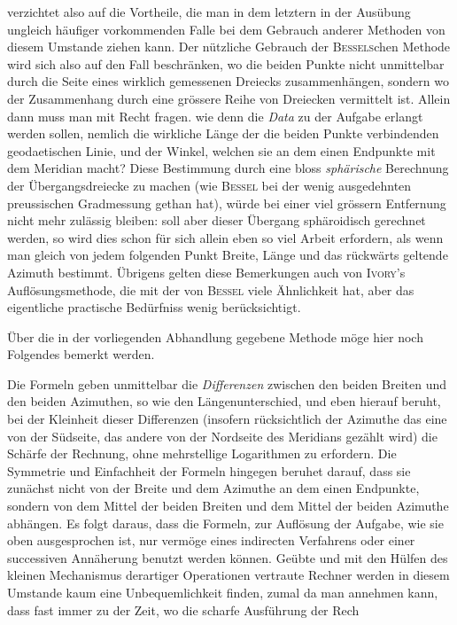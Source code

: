 %
verzichtet also auf die Vortheile, die man in dem letztern in der Ausübung ungleich häufiger vorkommenden Falle bei dem Gebrauch anderer Methoden von diesem Umstande ziehen kann. Der nützliche Gebrauch der \textsc{Bessels}chen Methode wird sich also auf den Fall beschränken, wo die beiden Punkte nicht unmittelbar durch die Seite eines wirklich gemessenen Dreiecks zusammenhängen, sondern wo der Zusammenhang durch eine grössere Reihe von Dreiecken vermittelt ist. Allein dann muss man mit Recht fragen. wie denn die \textit{Data} zu der Aufgabe erlangt werden sollen, nemlich die wirkliche Länge der die beiden Punkte verbindenden geodaetischen Linie, und der Winkel, welchen sie an dem einen Endpunkte mit dem Meridian macht? Diese Bestimmung durch eine bloss \textit{sphärische} Berechnung der Übergangsdreiecke zu machen (wie \textsc{Bessel} bei der wenig ausgedehnten preussischen Gradmessung gethan hat), würde bei einer viel grössern Entfernung nicht mehr zulässig bleiben: soll aber dieser Übergang sphäroidisch gerechnet werden, so wird dies schon für sich allein eben so viel Arbeit erfordern, als wenn man gleich von jedem folgenden Punkt Breite, Länge und das rückwärts geltende Azimuth bestimmt. Übrigens gelten diese Bemerkungen auch von \textsc{Ivory}'s Auflösungsmethode, die mit der von \textsc{Bessel} viele Ähnlichkeit hat, aber das eigentliche practische Bedürfniss wenig berücksichtigt.

Über die in der vorliegenden Abhandlung gegebene Methode möge hier noch Folgendes bemerkt werden.

Die Formeln geben unmittelbar die \textit{Differenzen} zwischen den beiden Breiten und den beiden Azimuthen, so wie den Längenunterschied, und eben hierauf beruht, bei der Kleinheit dieser Differenzen (insofern rücksichtlich der Azimuthe das eine von der Südseite, das andere von der Nordseite des Meridians gezählt wird) die Schärfe der Rechnung, ohne mehrstellige Logarithmen zu erfordern. Die Symmetrie und Einfachheit der Formeln hingegen beruhet darauf, dass sie zunächst nicht von der Breite und dem Azimuthe an dem einen Endpunkte, sondern von dem Mittel der beiden Breiten und dem Mittel der beiden Azimuthe abhängen. Es folgt daraus, dass die Formeln, zur Auflösung der Aufgabe, wie sie oben ausgesprochen ist, nur vermöge eines indirecten Verfahrens oder einer successiven Annäherung benutzt werden können. Geübte und mit den Hülfen des kleinen Mechanismus derartiger Operationen vertraute Rechner werden in diesem Umstande kaum eine Unbequemlichkeit finden, zumal da man annehmen kann, dass fast immer zu der Zeit, wo die scharfe Ausführung der Rech%

